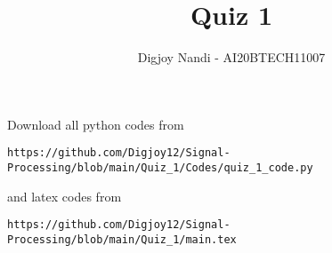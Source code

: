 \documentclass[journal,12pt,twocolumn]{IEEEtran}
\DeclareMathOperator*{\Res}{Res}
\begin{document}
\newcommand{\BEQA}{\begin{eqnarray}}
\newcommand{\EEQA}{\end{eqnarray}}
\newcommand{\define}{\stackrel{\triangle}{=}}

\raggedbottom
\setlength{\parindent}{0pt}
\providecommand{\mbf}{\mathbf}
\providecommand{\pr}[1]{\ensuremath{\Pr\left(#1\right)}}
\providecommand{\qfunc}[1]{\ensuremath{Q\left(#1\right)}}
\providecommand{\sbrak}[1]{\ensuremath{{}\left[#1\right]}}
\providecommand{\lsbrak}[1]{\ensuremath{{}\left[#1\right.}}
\providecommand{\rsbrak}[1]{\ensuremath{{}\left.#1\right]}}
\providecommand{\brak}[1]{\ensuremath{\left(#1\right)}}
\providecommand{\lbrak}[1]{\ensuremath{\left(#1\right.}}
\providecommand{\rbrak}[1]{\ensuremath{\left.#1\right)}}
\providecommand{\cbrak}[1]{\ensuremath{\left\{#1\right\}}}
\providecommand{\lcbrak}[1]{\ensuremath{\left\{#1\right.}}
\providecommand{\rcbrak}[1]{\ensuremath{\left.#1\right\}}}
\theoremstyle{remark}
\newtheorem{rem}{Remark}
\newcommand{\sgn}{\mathop{\mathrm{sgn}}}
\providecommand{\abs}[1]{\vert#1\vert}
\providecommand{\res}[1]{\Res\displaylimits_{#1}} 
\providecommand{\norm}[1]{\lVert#1\rVert}
\providecommand{\mtx}[1]{\mathbf{#1}}
\providecommand{\mean}[1]{E[ #1 ]}
\providecommand{\fourier}{\overset{\mathcal{F}}{ \rightleftharpoons}}
\providecommand{\system}{\overset{\mathcal{H}}{ \longleftrightarrow}}
\newcommand{\solution}{\noindent \textbf{Solution: }}
\newcommand{\cosec}{\,\text{cosec}\,}
\providecommand{\dec}[2]{\ensuremath{\overset{#1}{\underset{#2}{\gtrless}}}}
\newcommand{\myvec}[1]{\ensuremath{\begin{pmatrix}#1\end{pmatrix}}}
\newcommand{\mydet}[1]{\ensuremath{\begin{vmatrix}#1\end{vmatrix}}}
\makeatletter
{}
\makeatother
\let\StandardTheFigure\thefigure
\let\vec\mathbf
\renewcommand{\thefigure}{\theproblem}
\def\putbox#1#2#3{\makebox[0in][l]{\makebox[#1][l]{}\raisebox{\baselineskip}[0in][0in]{\raisebox{#2}[0in][0in]{#3}}}}
     \def\rightbox#1{\makebox[0in][r]{#1}}
     \def\centbox#1{\makebox[0in]{#1}}
     \def\topbox#1{\raisebox{-\baselineskip}[0in][0in]{#1}}
     \def\midbox#1{\raisebox{-0.5\baselineskip}[0in][0in]{#1}}
\vspace{3cm}
\title{Quiz 1}
\author{Digjoy Nandi - AI20BTECH11007}
\maketitle
\newpage
\bigskip
\renewcommand{\thefigure}{\theenumi}
\renewcommand{\thetable}{\theenumi}
Download all python codes from 
\begin{lstlisting}
https://github.com/Digjoy12/Signal-Processing/blob/main/Quiz_1/Codes/quiz_1_code.py
\end{lstlisting}
%
and latex codes from 
%
\begin{lstlisting}
https://github.com/Digjoy12/Signal-Processing/blob/main/Quiz_1/main.tex
\end{lstlisting}
\end{document}
